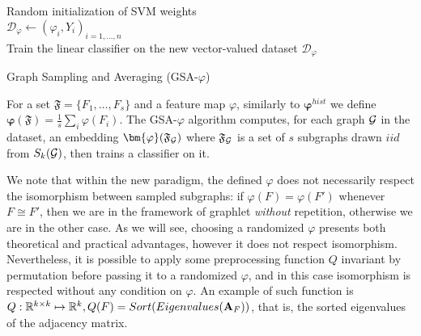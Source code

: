 \begin{algorithm}[H]\label{alg:GSA}
\DontPrintSemicolon
  \\
  \\
  \Algo{\\}
  Random initialization of SVM weights\\
  $\mathcal{D}_{\varphi}\gets (\varphi_i,Y_i)_{i=1,\ldots, n}$\\
  Train the linear classifier on the new vector-valued dataset $\mathcal{D}_{\varphi}$
\caption{Graph Sampling and Averaging (GSA-$\varphi$)}
\end{algorithm}

For a set $\mathfrak{F} = \{F_1,\ldots, F_s\}$ and a feature map $\varphi$, similarly to $\bm{\varphi}^{hist}$ we define $\bm{\varphi}(\mathfrak{F}) = \frac{1}{s} \sum_i \varphi(F_i)$. The GSA-$\varphi$ algorithm computes, for each graph $\mathcal{G}$ in the dataset, an embedding $\bm{\varphi}(\mathfrak{F}_\G)$ where $\mathfrak{F}_{\mathcal{G}}$ is a set of $s$ subgraphs drawn $iid$ from $S_k(\mathcal{G})$, then trains a classifier on it.

We note that within the new paradigm, the defined $\varphi$ does not necessarily respect the isomorphism between sampled subgraphs: if $\varphi(F) = \varphi(F')$ whenever $F \cong F'$, then we are in the framework of graphlet \emph{without} repetition, otherwise we are in the other case. As we will see, choosing a randomized $\varphi$ presents both theoretical and practical advantages, however it does not respect isomorphism. Nevertheless, it is possible to apply some preprocessing function $Q$ invariant by permutation before passing it to a randomized $\varphi$, and in this case isomorphism is respected without any condition on $\varphi$. An example of such function is $Q:\mathbb{R}^{k\times k}\mapsto \mathbb{R}^k, Q(F)=Sort(Eigenvalues(\mathbf{A}_F))$, that is, the sorted eigenvalues of the adjacency matrix.


